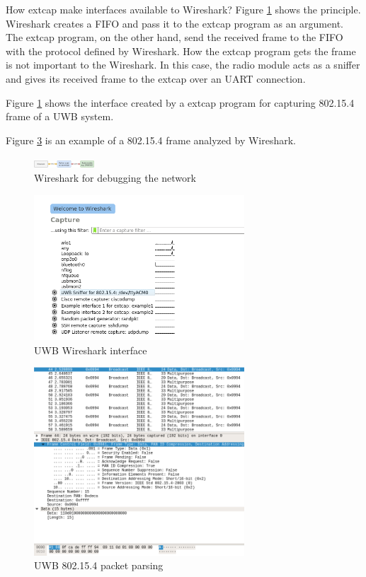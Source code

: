 \documentclass[\main/thesis.tex]{subfiles}
\begin{document}
How extcap make interfaces available to Wireshark? Figure \ref{fig:extcap_802_15_4} shows the principle. Wireshark creates a FIFO and pass it to the extcap program as an argument. The extcap program, on the other hand, send the received frame to the FIFO with the protocol defined by Wireshark. How the extcap program gets the frame is not important to the Wireshark. In this case, the radio module acts as a sniffer and gives its received frame to the extcap over an UART connection.

Figure \ref{fig:extcap_802_15_4} shows the interface created by a extcap program for capturing 802.15.4 frame of a UWB system.

Figure \ref{fig:wireshark_802_15_5_packet} is an example of a 802.15.4 frame analyzed by Wireshark.

\begin{figure}[H]
    \begin{center}
        \includegraphics[width=0.2\textwidth]{extcap_802_15_4.png}
    \end{center}
    \caption{Wireshark for debugging the network}
    \label{fig:extcap_802_15_4}
\end{figure}

\begin{figure}[H]
    \begin{center}
        \includegraphics[width=0.7\textwidth]{wireshark_interface.png}
    \end{center}
    \caption{UWB Wireshark interface}
    \label{fig:wireshark_interface}
\end{figure}

\begin{figure}[H]
    \begin{center}
        \includegraphics[width=0.7\textwidth]{wireshark_802_15_5_packet.png}
    \end{center}
    \caption{UWB 802.15.4 packet parsing}
    \label{fig:wireshark_802_15_5_packet}
\end{figure}

\bib
\end{document}
